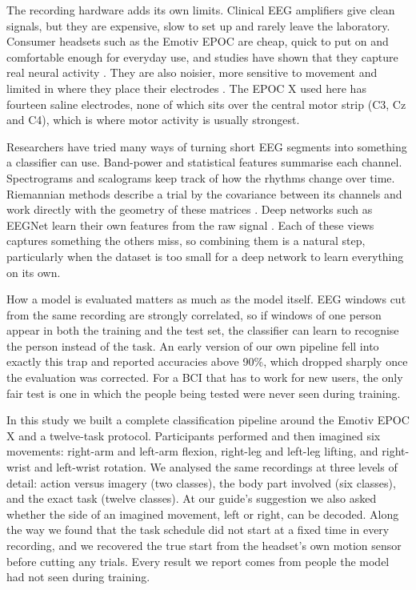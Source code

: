 \documentclass[pdflatex,sn-mathphys-num]{sn-jnl}%
\theoremstyle{thmstyleone}%
\theoremstyle{thmstyletwo}%
\theoremstyle{thmstylethree}%
\begin{document}
The recording hardware adds its own limits. Clinical EEG amplifiers give clean signals, but they are expensive, slow to set up and rarely leave the laboratory. Consumer headsets such as the Emotiv EPOC are cheap, quick to put on and comfortable enough for everyday use, and studies have shown that they capture real neural activity \citep{Badcock2013,Duvinage2013}. They are also noisier, more sensitive to movement and limited in where they place their electrodes \citep{Maskeliunas2016}. The EPOC X used here has fourteen saline electrodes, none of which sits over the central motor strip (C3, Cz and C4), which is where motor activity is usually strongest.

Researchers have tried many ways of turning short EEG segments into something a classifier can use. Band-power and statistical features summarise each channel. Spectrograms and scalograms keep track of how the rhythms change over time. Riemannian methods describe a trial by the covariance between its channels and work directly with the geometry of these matrices \citep{Barachant2012,Congedo2017}. Deep networks such as EEGNet learn their own features from the raw signal \citep{Schirrmeister2017,Lawhern2018}. Each of these views captures something the others miss, so combining them is a natural step, particularly when the dataset is too small for a deep network to learn everything on its own.

How a model is evaluated matters as much as the model itself. EEG windows cut from the same recording are strongly correlated, so if windows of one person appear in both the training and the test set, the classifier can learn to recognise the person instead of the task. An early version of our own pipeline fell into exactly this trap and reported accuracies above 90\%, which dropped sharply once the evaluation was corrected. For a BCI that has to work for new users, the only fair test is one in which the people being tested were never seen during training.

In this study we built a complete classification pipeline around the Emotiv EPOC X and a twelve-task protocol. Participants performed and then imagined six movements: right-arm and left-arm flexion, right-leg and left-leg lifting, and right-wrist and left-wrist rotation. We analysed the same recordings at three levels of detail: action versus imagery (two classes), the body part involved (six classes), and the exact task (twelve classes). At our guide's suggestion we also asked whether the side of an imagined movement, left or right, can be decoded. Along the way we found that the task schedule did not start at a fixed time in every recording, and we recovered the true start from the headset's own motion sensor before cutting any trials. Every result we report comes from people the model had not seen during training.
\end{document}
